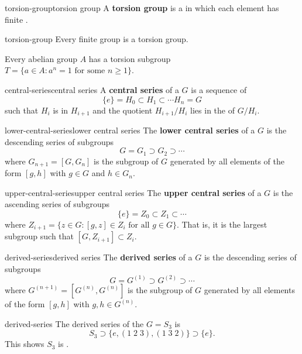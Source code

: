 \begin{topic}{torsion-group}{torsion group}
    A \textbf{torsion group} is a  in which each element has finite .
\end{topic}

\begin{example}{torsion-group}
    Every finite group is a torsion group.
    
    Every abelian group $A$ has a torsion subgroup $T = \{ a \in A : a^n = 1 \text{ for some } n \ge 1 \}$.
\end{example}

\begin{topic}{central-series}{central series}
    A \textbf{central series} of a  $G$ is a sequence of 
    \[ \{ e \} = H_0 \subset H_1 \subset \cdots H_n = G \]
    such that $H_i$ is  in $H_{i + 1}$ and the quotient $H_{i + 1}/H_i$ lies in the  of $G/H_i$.
\end{topic}

\begin{topic}{lower-central-series}{lower central series}
    The \textbf{lower central series} of a  $G$ is the descending series of subgroups
    \[ G = G_1 \supset G_2 \supset \cdots \]
    where $G_{n + 1} = [G, G_n]$ is the subgroup of $G$ generated by all elements of the form $[g, h]$ with $g \in G$ and $h \in G_n$.
\end{topic}

\begin{topic}{upper-central-series}{upper central series}
    The \textbf{upper central series} of a  $G$ is the ascending series of subgroups
    \[ \{ e \} = Z_0 \subset Z_1 \subset \cdots \]
    where $Z_{i + 1} = \{ z \in G : [g, z] \in Z_i \text{ for all } g \in G \}$. That is, it is the largest subgroup such that $[G, Z_{i + 1}] \subset Z_i$.
\end{topic}

\begin{topic}{derived-series}{derived series}
    The \textbf{derived series} of a  $G$ is the descending series of subgroups
    \[ G = G^{(1)} \supset G^{(2)} \supset \cdots \]
    where $G^{(n + 1)} = [G^{(n)}, G^{(n)}]$ is the subgroup of $G$ generated by all elements of the form $[g, h]$ with $g, h \in G^{(n)}$.
\end{topic}

\begin{example}{derived-series}
    The derived series of the  $G = S_3$ is
    \[ S_3 \supset \{ e, (1 \; 2 \; 3), (1 \; 3 \; 2) \} \supset \{ e \} . \]
    This shows $S_3$ is .
\end{example}

